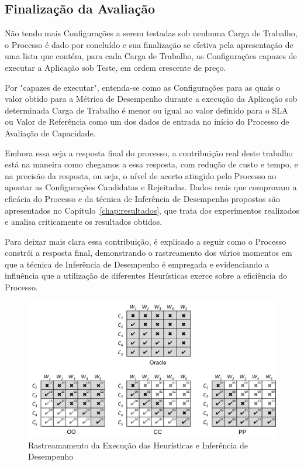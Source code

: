 \subsection{Finalização da Avaliação}
Não tendo mais Configurações a serem testadas sob nenhuma Carga de Trabalho, o 
Processo é dado por concluído e sua finalização se efetiva pela apresentação de uma
lista que contém, para cada Carga de Trabalho, as Configurações capazes de executar
a Aplicação sob Teste, em ordem crescente de preço.

Por "capazes de executar", entenda-se como as Configurações para as quais o valor
obtido para a Métrica de Desempenho durante a execução da Aplicação sob determinada
Carga de Trabalho é menor ou igual ao valor definido para o SLA ou Valor de Referência
como um dos dados de entrada no início do Processo de Avaliação de Capacidade.

Embora essa seja a resposta final do processo, a contribuição real deste trabalho está
na maneira como chegamos a essa resposta, com redução de custo e tempo, e na precisão 
da resposta, ou seja, o nível de acerto atingido pelo Processo ao apontar as Configurações
Candidatas e Rejeitadas. Dados reais que comprovam a eficácia do 
Processo e da técnica de Inferência de Desempenho propostos são apresentados no
Capítulo~\ref{chap:resultados}, que trata dos experimentos realizados e analisa criticamente os resultados obtidos.

Para deixar mais clara essa contribuição, é explicado a seguir
como o Processo constrói a resposta final, demonstrando o rastreamento dos vários momentos
em que a técnica de Inferência de Desempenho é empregada e evidenciando a influência que
a utilização de diferentes Heurísticas exerce sobre a eficiência do Processo.

\begin{figure}
  \caption{\label{fig:fig_processo_traces}Rastreamamento da Execução das Heurísticas e Inferência de Desempenho}
  \begin{center}
    \includegraphics[scale=0.6]{img/traces}
  \end{center}
\end{figure}


